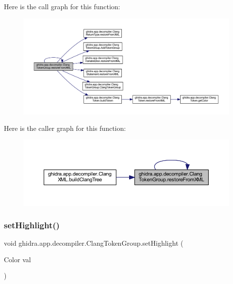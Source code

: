 Here is the call graph for this function\+:
\nopagebreak
\begin{figure}[H]
\begin{center}
\leavevmode
\includegraphics[width=350pt]{classghidra_1_1app_1_1decompiler_1_1_clang_token_group_ad6415521aaa042312b788162e577029c_cgraph}
\end{center}
\end{figure}
Here is the caller graph for this function\+:
\nopagebreak
\begin{figure}[H]
\begin{center}
\leavevmode
\includegraphics[width=350pt]{classghidra_1_1app_1_1decompiler_1_1_clang_token_group_ad6415521aaa042312b788162e577029c_icgraph}
\end{center}
\end{figure}
\mbox{\label{classghidra_1_1app_1_1decompiler_1_1_clang_token_group_a1d6830afbeca1ea9affffb6fae945aff}} 
\subsubsection{\texorpdfstring{setHighlight()}{setHighlight()}}
{\footnotesize\ttfamily void ghidra.\+app.\+decompiler.\+Clang\+Token\+Group.\+set\+Highlight (\begin{DoxyParamCaption}\item[{Color}]{val }\end{DoxyParamCaption})\hspace{0.3cm}{\ttfamily [inline]}}



